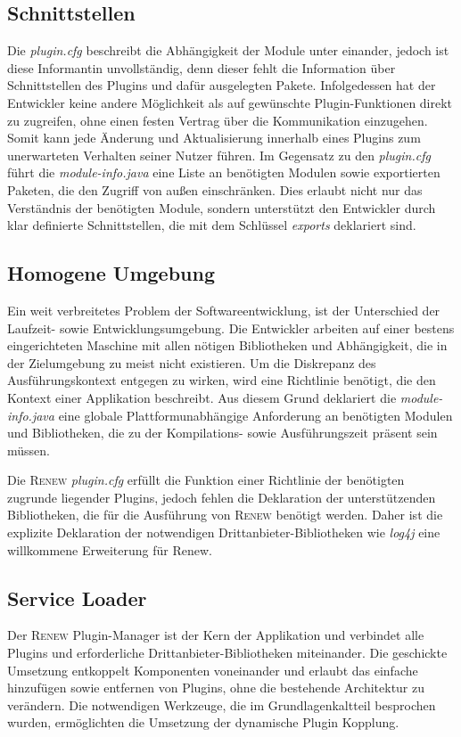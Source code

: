 \subsection{Schnittstellen}
	Die \textit{plugin.cfg} beschreibt die Abhängigkeit der Module unter einander, jedoch ist diese Informantin unvollständig, denn dieser fehlt die Information über Schnittstellen des Plugins und dafür ausgelegten Pakete. Infolgedessen hat der Entwickler keine andere Möglichkeit als auf gewünschte Plugin-Funktionen direkt zu zugreifen, ohne einen festen Vertrag über die Kommunikation einzugehen. Somit kann jede Änderung und Aktualisierung innerhalb eines Plugins zum unerwarteten Verhalten seiner Nutzer führen. \newline
	Im Gegensatz zu den \textit{plugin.cfg} führt die \textit{module-info.java} eine Liste an benötigten Modulen sowie exportierten Paketen, die den Zugriff von außen einschränken. Dies erlaubt nicht nur das Verständnis der benötigten Module, sondern unterstützt den Entwickler durch klar definierte Schnittstellen, die mit dem Schlüssel \textit{exports} deklariert sind.

\subsection{Homogene Umgebung}
	Ein weit verbreitetes Problem der Softwareentwicklung, ist der Unterschied der Laufzeit- sowie Entwicklungsumgebung. Die Entwickler arbeiten auf einer bestens eingerichteten Maschine mit allen nötigen Bibliotheken und Abhängigkeit, die in der Zielumgebung zu meist nicht existieren. Um die Diskrepanz des Ausführungskontext entgegen zu wirken, wird eine Richtlinie benötigt, die den Kontext einer Applikation beschreibt. Aus diesem Grund deklariert die \textit{module-info.java} eine globale Plattformunabhängige Anforderung an benötigten Modulen und Bibliotheken, die zu der Kompilations- sowie Ausführungszeit präsent sein müssen.\bigbreak

	Die \textsc{Renew} \textit{plugin.cfg} erfüllt die Funktion einer Richtlinie der benötigten zugrunde liegender Plugins, jedoch fehlen die Deklaration der unterstützenden Bibliotheken, die für die Ausführung von \textsc{Renew} benötigt werden. Daher ist die explizite Deklaration der notwendigen Drittanbieter-Bibliotheken wie \textit{log4j} eine willkommene Erweiterung für Renew. 

\subsection{Service Loader} 
	Der \textsc{Renew} Plugin-Manager ist der Kern der Applikation und verbindet alle Plugins und erforderliche Drittanbieter-Bibliotheken miteinander. Die geschickte Umsetzung entkoppelt Komponenten voneinander und erlaubt das einfache hinzufügen sowie entfernen von Plugins, ohne die bestehende Architektur zu verändern. Die notwendigen Werkzeuge, die im Grundlagenkaltteil besprochen wurden, ermöglichten die Umsetzung der dynamische Plugin Kopplung. \bigbreak

